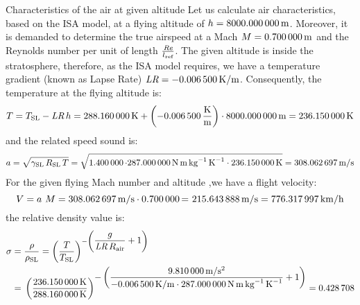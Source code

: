 \documentclass[[12pt,twoside]{book}
\begin{document}
%

%
\begin{myExampleX}{Characteristics of the air at given altitude}{}%
\label{example:Characteristics:Of:The:Air:At:A:Certain:Altitude}
%
\noindent
Let us calculate air characteristics, based on the ISA model, at a flying altitude of $h=\SI[round-precision=0]{\myAltitudeM}{m}$.
% 
Moreover, it is demanded to determine the true airspeed at a Mach $M=\SI[round-precision=2]{\myMachnumber}{m}$ and the Reynolds number per unit of length $\frac{\text{\itshape Re} }{l_\text{ref}}$. The given altitude is inside the stratosphere, therefore, as the ISA model requires, we have a temperature gradient (known as Lapse Rate) $\text{\itshape LR}=\SI[round-precision=4]{\myTemperaturegradient}{K/m}$.
Consequently, the temperature at the flying altitude is:
\[
T = {T_\text{SL}- \text{\itshape LR} \, h   
    = \SI[round-precision=2]{\myTemperaturesealevelK}{K}
        + \left( \SI[round-precision=4]{\myTemperaturegradient}{\frac{K}{m}} \right) \cdot\SI[round-precision=0]{\myAltitudeM}{m} } 
    = \SI[round-precision=1]{\myTemperatureK}{K}
\]
and the related speed sound is:
\[
a =\sqrt{
    \gamma_\text{SL} \, R_\text{SL} \,T}
    = \sqrt{
        \SI[round-precision=1]{\myAdiabaticindex} \cdot
        \SI[round-precision=0]{\myAirspecificconstant}{N\,m\,kg^{-1}\,K^{-1}} \cdot
        \SI[round-precision=2]{\myTemperatureK}{K}} 
    = \SI[round-precision=2]{\mySoundspeed}{m/s}
\]
\noindent
%
For the given flying Mach number and altitude ,we have a flight velocity:
\[
 V = {a }~{M} =\SI[round-precision=2]{\mySoundspeed}{m/s} \cdot \SI[round-precision=2]{\myMachnumber}= ~\SI[round-precision=2]{\mySpeedMs}{m/s} = \SI[round-precision=2]{\mySpeedkmh}{km/h} 
 \]
the relative density value is:
\[
\begin{split}
\sigma 
    & ={} \frac{\rho}{\rho_\text{SL}} = 
    \left( \frac{T}{T_\text{SL} } \right)^{
        -\left(\displaystyle \dfrac{ g }{\textit{LR}\, R_\text{air}} + 1 \right)
        } 
    \\ 
    & ={} \left(\frac{
        \SI[round-precision=2]{\myTemperatureK}{K} 
        }{
        \SI[round-precision=2]{\myTemperaturesealevelK}{K}
        }\right)^{\displaystyle
            -\left( \dfrac{
                \SI[round-precision=2]{\myGravitationalacceleration}{m/s^2}
                }{
                \SI[round-precision=4]{\myTemperaturegradient}{K/m}
                \cdot
                \SI[round-precision=0]{\myAirspecificconstant}{N\,m\,kg^{-1}\,K^{-1}}
                }{}
            + 1 \right)
        }
        = \SI[round-precision=3]{\myRelativedensity}{}
\end{split}
\]


\end{myExampleX}
\end{document}
